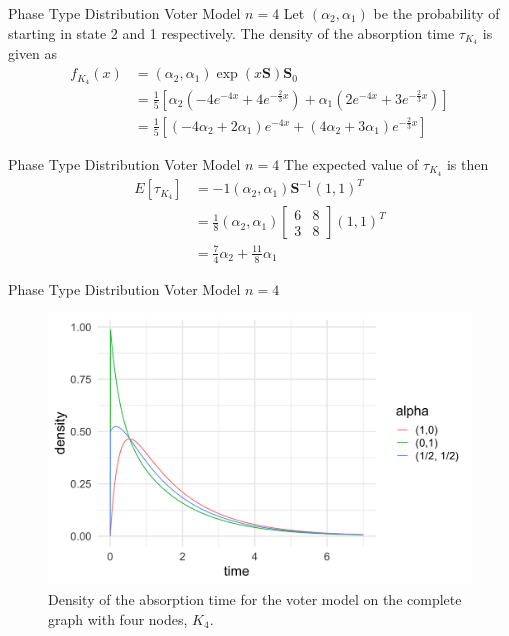 \documentclass{beamer}
\theoremstyle{definition}
\begin{document}
\begin{frame}{Phase Type Distribution Voter Model $n = 4$}
    Let $(\alpha_2, \alpha_1)$ be the probability of starting in state 2 and 1 respectively.
    The density of the absorption time $\tau_{K_4}$ is given as
\begin{align*}
    f_{K_4}(x) &= (\alpha_2, \alpha_1) \exp(x\mathbf{S}) \mathbf{S}_0\\
    &= \frac{1}{5} \left[ \alpha_2 \left( -4 e^{-4x} + 4 e^{-\frac{2}{3} x} \right) + \alpha_1 \left( 2 e^{-4x} + 3 e^{-\frac{2}{3} x} \right) \right]\\
&= \frac{1}{5} \left[ (-4 \alpha_2 + 2 \alpha_1) e^{-4x} + (4 \alpha_2 + 3 \alpha_1) e^{-\frac{2}{3} x}\right]
\end{align*}
\end{frame}

\begin{frame}{Phase Type Distribution Voter Model $n = 4$}
    The expected value of $\tau_{K_4}$ is then
\begin{align*}
    E[\tau_{K_4}] &= -1 (\alpha_2, \alpha_1) \mathbf{S}^{-1} (1, 1)^T\\
    &= \frac{1}{8} (\alpha_2, \alpha_1) \begin{bmatrix}
    6 & 8\\
    3 & 8
    \end{bmatrix} (1,1)^T\\
    &= \frac{7}{4} \alpha_2 + \frac{11}{8} \alpha_1
\end{align*}
\end{frame}

\begin{frame}{Phase Type Distribution Voter Model $n = 4$}
    \begin{figure}[H]
  \centering
    \includegraphics[width=.9\textwidth]{figures/voter_density_c4.png}
   \caption{Density of the absorption time for the voter model on the complete graph with four nodes, $K_4$.}
  \label{fig:voter_density_c4}
\end{figure}
\end{frame}
\end{document}
